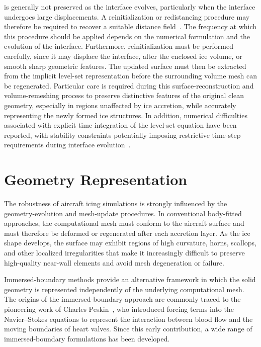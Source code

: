 is generally not preserved as the interface evolves, particularly when the interface undergoes large displacements. A reinitialization or redistancing procedure may therefore be required to recover a suitable distance field~\cite{papillonlaroche2026geometricreinitializationcapillaryflows}. The frequency at which this procedure should be applied depends on the numerical formulation and the evolution of the interface. Furthermore, reinitialization must be performed carefully, since it may displace the interface, alter the enclosed ice volume, or smooth sharp geometric features\cite{alkebsiPhd}. The updated surface must then be extracted from the implicit level-set representation before the surrounding volume mesh can be regenerated. Particular care is required during this surface-reconstruction and volume-remeshing process to preserve distinctive features of the original clean geometry, especially in regions unaffected by ice accretion, while accurately representing the newly formed ice structures. In addition, numerical difficulties associated with explicit time integration of the level-set equation have been reported, with stability constraints potentially imposing restrictive time-step requirements during interface evolution~\cite{bourgault-coteMultilayerAirfoilIce2019}.

\section{Geometry Representation}\label{sec:review_ibm}

The robustness of aircraft icing simulations is strongly influenced by the geometry-evolution and mesh-update procedures. In conventional body-fitted approaches, the computational mesh must conform to the aircraft surface and must therefore be deformed or regenerated after each accretion layer. As the ice shape develops, the surface may exhibit regions of high curvature, horns, scallops, and other localized irregularities that make it increasingly difficult to preserve high-quality near-wall elements and avoid mesh degeneration or failure.

Immersed-boundary methods provide an alternative framework in which the solid geometry is represented independently of the underlying computational mesh. The origins of the immersed-boundary approach are commonly traced to the pioneering work of Charles Peskin~\cite{PESKIN1972252}, who introduced forcing terms into the Navier–Stokes equations to represent the interaction between blood flow and the moving boundaries of heart valves. Since this early contribution, a wide range of immersed-boundary formulations has been developed.

